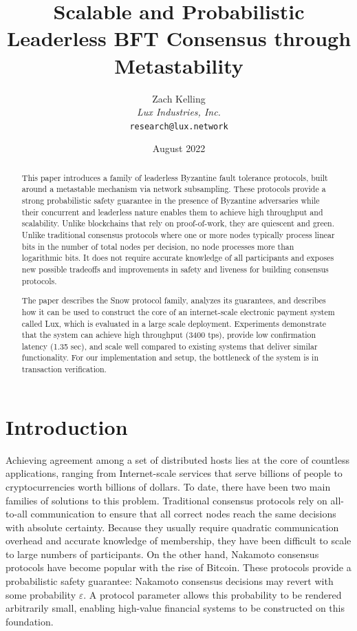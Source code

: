\documentclass[11pt]{article}
\title{Scalable and Probabilistic Leaderless BFT Consensus through Metastability}
\author{Zach Kelling\\\textit{Lux Industries, Inc.}\\\texttt{research@lux.network}}
\date{August 2022}
\begin{document}
\luxcoverpage

\begin{abstract}
This paper introduces a family of leaderless Byzantine fault
tolerance protocols, built around a metastable mechanism
via network subsampling. These protocols provide a strong
probabilistic safety guarantee in the presence of Byzantine
adversaries while their concurrent and leaderless nature enables them to achieve high throughput and scalability. Unlike
blockchains that rely on proof-of-work, they are quiescent and
green. Unlike traditional consensus protocols where one or
more nodes typically process linear bits in the number of total
nodes per decision, no node processes more than logarithmic
bits. It does not require accurate knowledge of all participants
and exposes new possible tradeoffs and improvements in safety
and liveness for building consensus protocols.

The paper describes the Snow protocol family, analyzes
its guarantees, and describes how it can be used to construct
the core of an internet-scale electronic payment system called
Lux, which is evaluated in a large scale deployment.
Experiments demonstrate that the system can achieve high
throughput (3400 tps), provide low confirmation latency (1.35
sec), and scale well compared to existing systems that deliver
similar functionality. For our implementation and setup, the
bottleneck of the system is in transaction verification.
\end{abstract}

\tableofcontents
\newpage

\section{Introduction}

Achieving agreement among a set of distributed hosts lies at
the core of countless applications, ranging from Internet-scale
services that serve billions of people to cryptocurrencies worth billions of dollars. To date, there have been
two main families of solutions to this problem. Traditional
consensus protocols rely on all-to-all communication to ensure that all correct nodes reach the same decisions with
absolute certainty. Because they usually require quadratic
communication overhead and accurate knowledge of membership, they have been difficult to scale to large numbers of
participants. On the other hand, Nakamoto consensus protocols have become popular with
the rise of Bitcoin. These protocols provide a probabilistic
safety guarantee: Nakamoto consensus decisions may revert
with some probability $\varepsilon$. A protocol parameter allows this
probability to be rendered arbitrarily small, enabling high-value financial systems to be constructed on this foundation.
\end{document}
